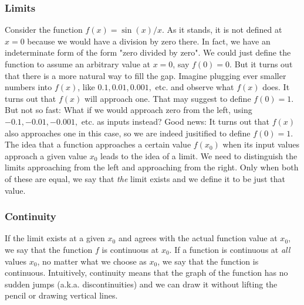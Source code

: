 \subsubsection{Limits}
Consider the function $f(x) = \sin (x) / x$. As it stands, it is not defined at $x = 0$ because we would have a division by zero there. In fact, we have an indeterminate form of the form "zero divided by zero". We could just define the function to assume an arbitrary value at $x = 0$, say $f(0) = 0$. But it turns out that there is a more natural way to fill the gap. Imagine plugging ever smaller numbers into $f(x)$, like $0.1, 0.01, 0.001, $ etc. and observe what $f(x)$ does. It turns out that $f(x)$ will approach one. That may suggest to define $f(0) = 1$. But not so fast: What if we would approach zero from the left, using $-0.1, -0.01, -0.001,$ etc. as inputs instead? Good news: It turns out that $f(x)$ also approaches one in this case, so we are indeed jusitified to define $f(0)=1$. The idea that a function approaches a certain value $f(x_0)$ when its input values approach a given value $x_0$ leads to the idea of a limit. We need to distinguish the limits approaching from the left and approaching from the right. Only when both of these are equal, we say that \emph{the} limit exists and we define it to be just that value. 


\subsubsection{Continuity}
If the limit exists at a given $x_0$ and agrees with the actual function value at $x_0$, we say that the function $f$ is continuous at $x_0$. If a function is continuous at \emph{all} values $x_0$, no matter what we choose as $x_0$, we say that the function is continuous. Intuitively, continuity means that the graph of the function has no sudden jumps (a.k.a. discontinuities) and we can draw it without lifting the pencil or drawing vertical lines.


